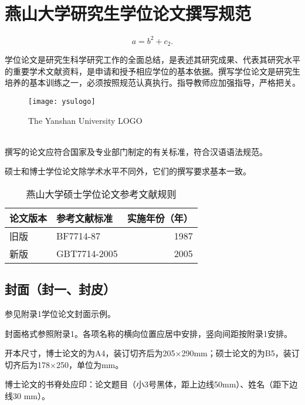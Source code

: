 \chapter{燕山大学研究生学位论文撰写规范}
\label{appendix}
\renewcommand\theequation{A-\arabic{equation}}
\renewcommand\thefigure{A-\arabic{figure}}
\renewcommand\thetable{A-\arabic{table}}


\begin{equation}\label{A1}
a=b^2+c_2.
\end{equation}

学位论文是研究生科学研究工作的全面总结，是表述其研究成果、代表其研究水平的重要学术文献资料，是申请和授予相应学位的基本依据。撰写学位论文是研究生培养的基本训练之一，必须按照规范认真执行。指导教师应加强指导，严格把关。
\begin{figure}[htbp]
\centering
\texttt{[image: ysulogo]}
\caption{The Yanshan University LOGO}
\end{figure}\\
撰写的论文应符合国家及专业部门制定的有关标准，符合汉语语法规范。

硕士和博士学位论文除学术水平不同外，它们的撰写要求基本一致。

\begin{table}[htbp]
 \centering{}
 \caption{燕山大学硕士学位论文参考文献规则}\label{tab:ysubof1}
 \begin{tabular}{llr}
 \toprule
    论文版本    & 参考文献标准    & 实施年份（年）  \\
 \midrule
    旧版        & BF7714-87       & 1987            \\
    新版        & GBT7714-2005    & 2005            \\
 \bottomrule
 \end{tabular}
\end{table}

\section{封面（封一、封皮）}\label{appendixA-1}

参见附录1学位论文封面示例。

封面格式参照附录1。各项名称的横向位置应居中安排，竖向间距按附录1安排。

开本尺寸，博士论文的为A4，装订切齐后为205×290mm；硕士论文的为B5，装订切齐后为178×250，单位为mm。

博士论文的书脊处应印：论文题目（小3号黑体，距上边线50mm）、姓名（距下边线30 mm）。

